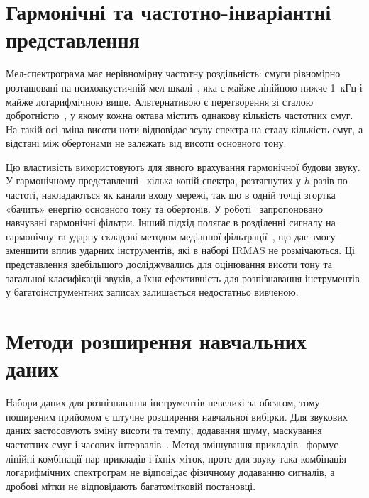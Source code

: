 \section{Гармонічні та частотно-інваріантні представлення}
\label{sec:harmonic}

Мел-спектрограма має нерівномірну частотну роздільність: смуги рівномірно
розташовані на психоакустичній мел-шкалі~\cite{stevens1937}, яка є майже
лінійною нижче 1~кГц і майже логарифмічною вище. Альтернативою є
перетворення зі сталою добротністю~\cite{brown1991}, у якому кожна октава
містить однакову кількість частотних смуг. На такій осі зміна висоти ноти
відповідає зсуву спектра на сталу кількість смуг, а відстані між
обертонами не залежать від висоти основного тону.

Цю властивість використовують для явного врахування гармонічної будови
звуку. У гармонічному представленні~\cite{bittner2017} кілька копій
спектра, розтягнутих у $h$ разів по частоті, накладаються як канали входу
мережі, так що в одній точці згортка «бачить» енергію основного тону та
обертонів. У роботі~\cite{won2020} запропоновано навчувані гармонічні
фільтри. Інший підхід полягає в розділенні сигналу на гармонічну та ударну
складові методом медіанної фільтрації~\cite{fitzgerald2010}, що дає змогу
зменшити вплив ударних інструментів, які в наборі IRMAS не розмічаються.
Ці представлення здебільшого досліджувались для оцінювання висоти тону та
загальної класифікації звуків, а їхня ефективність для розпізнавання
інструментів у багатоінструментних записах залишається недостатньо
вивченою.

\section{Методи розширення навчальних даних}
\label{sec:augmentation}

Набори даних для розпізнавання інструментів невеликі за обсягом, тому
поширеним прийомом є штучне розширення навчальної вибірки. Для звукових
даних застосовують зміну висоти та темпу, додавання шуму, маскування
частотних смуг і часових інтервалів~\cite{park2019,schluter2015}.
Метод змішування прикладів~\cite{zhang2018} формує лінійні комбінації
пар прикладів і їхніх міток, проте для звуку така комбінація логарифмічних
спектрограм не відповідає фізичному додаванню сигналів, а дробові мітки
не відповідають багатомітковій постановці.

